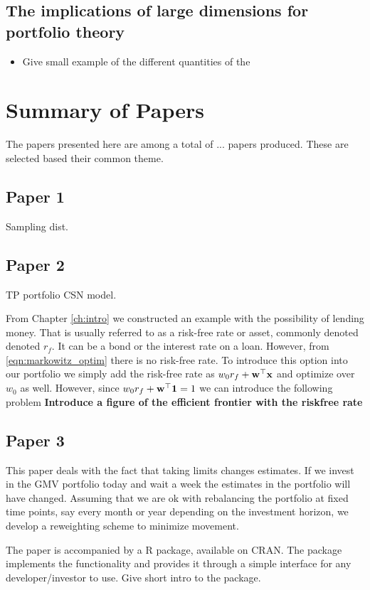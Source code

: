 \documentclass[]{book}
\begin{document}
\section{The implications of large dimensions for portfolio theory}
\begin{itemize}
	\item Give small example of the different quantities of the 
\end{itemize}
\chapter{Summary of Papers}
The papers presented here are among a total of ... papers produced. These are selected based their common theme.
\section*{Paper 1}
Sampling dist.
\section*{Paper 2}
TP portfolio CSN model.

From Chapter \ref{ch:intro} we constructed an example with the possibility of lending money. That is usually referred to as a risk-free rate or asset, commonly denoted denoted $r_f$. It can be a bond or the interest rate on a loan. However, from \eqref{eqn:markowitz_optim} there is no risk-free rate. To introduce this option into our portfolio we simply add the risk-free rate as $w_0 r_f + \mathbf{w}^\top \mathbf{x}$ and optimize over $w_0$ as well. However, since $w_0 r_f + \mathbf{w}^\top \mathbf{1}=1$ we can introduce the following problem
\textbf{Introduce a figure of the efficient frontier with the riskfree rate}
\section*{Paper 3}
This paper deals with the fact that taking limits changes estimates. If we invest in the GMV portfolio today and wait a week the estimates in the portfolio will have changed. Assuming that we are ok with rebalancing the portfolio at fixed time points, say every month or year depending on the investment horizon, we develop a reweighting scheme to minimize movement. 

The paper is accompanied by a R package, available on CRAN. The package implements the functionality and provides it through a simple interface for any developer/investor to use. Give short intro to the package. 
\end{document}
